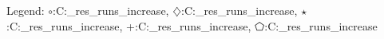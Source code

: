 Legend: {\color{CornflowerBlue}$\circ$}:C:\Users\tristan\Documents\ppsn\BBOB\raw\_res\remaining\_runs\sigmalb\_increase\exdata{}, {\color{Orange}$\diamondsuit$}:C:\Users\tristan\Documents\ppsn\BBOB\raw\_res\remaining\_runs\sigmalb\_increase\exdata{}, {\color{Green}$\star$}:C:\Users\tristan\Documents\ppsn\BBOB\raw\_res\remaining\_runs\sigmalb\_increase\exdata{}, {\color{red}+}:C:\Users\tristan\Documents\ppsn\BBOB\raw\_res\remaining\_runs\sigmalb\_increase\exdata{}, {\color{magenta}$\pentagon$}:C:\Users\tristan\Documents\ppsn\BBOB\raw\_res\remaining\_runs\sigmalb\_increase\exdata{}